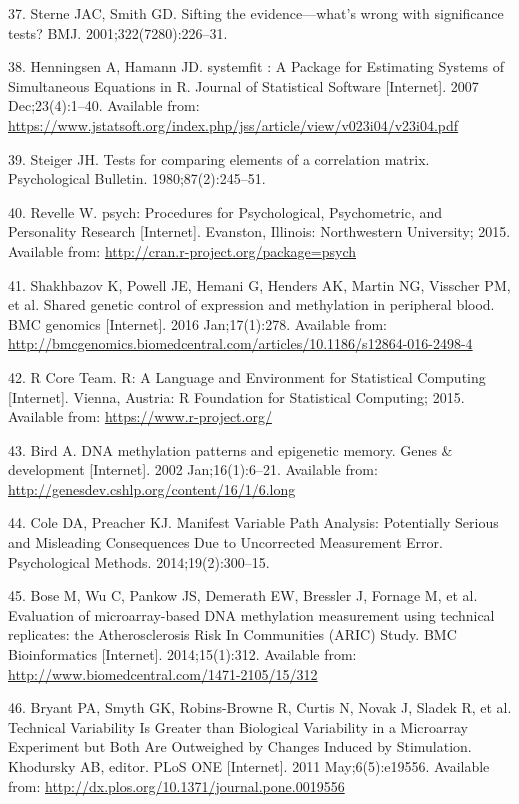 \documentclass[]{article}
\begin{document}
\hypertarget{ref-Sterne2001}{}
37. Sterne JAC, Smith GD. Sifting the evidence---what's wrong with
significance tests? BMJ. 2001;322(7280):226--31.

\hypertarget{ref-Henningsen2007}{}
38. Henningsen A, Hamann JD. systemfit : A Package for Estimating
Systems of Simultaneous Equations in R. Journal of Statistical Software
{[}Internet{]}. 2007 Dec;23(4):1--40. Available from:
\url{https://www.jstatsoft.org/index.php/jss/article/view/v023i04/v23i04.pdf}

\hypertarget{ref-Steiger1980}{}
39. Steiger JH. Tests for comparing elements of a correlation matrix.
Psychological Bulletin. 1980;87(2):245--51.

\hypertarget{ref-Revelle2015}{}
40. Revelle W. psych: Procedures for Psychological, Psychometric, and
Personality Research {[}Internet{]}. Evanston, Illinois: Northwestern
University; 2015. Available from:
\url{http://cran.r-project.org/package=psych}

\hypertarget{ref-Shakhbazov2016}{}
41. Shakhbazov K, Powell JE, Hemani G, Henders AK, Martin NG, Visscher
PM, et al. Shared genetic control of expression and methylation in
peripheral blood. BMC genomics {[}Internet{]}. 2016 Jan;17(1):278.
Available from:
\url{http://bmcgenomics.biomedcentral.com/articles/10.1186/s12864-016-2498-4}

\hypertarget{ref-RCoreTeam2015}{}
42. R Core Team. R: A Language and Environment for Statistical Computing
{[}Internet{]}. Vienna, Austria: R Foundation for Statistical Computing;
2015. Available from: \url{https://www.r-project.org/}

\hypertarget{ref-Bird2002}{}
43. Bird A. DNA methylation patterns and epigenetic memory. Genes \&
development {[}Internet{]}. 2002 Jan;16(1):6--21. Available from:
\url{http://genesdev.cshlp.org/content/16/1/6.long}

\hypertarget{ref-Cole2014}{}
44. Cole DA, Preacher KJ. Manifest Variable Path Analysis: Potentially
Serious and Misleading Consequences Due to Uncorrected Measurement
Error. Psychological Methods. 2014;19(2):300--15.

\hypertarget{ref-Bose2014}{}
45. Bose M, Wu C, Pankow JS, Demerath EW, Bressler J, Fornage M, et al.
Evaluation of microarray-based DNA methylation measurement using
technical replicates: the Atherosclerosis Risk In Communities (ARIC)
Study. BMC Bioinformatics {[}Internet{]}. 2014;15(1):312. Available
from: \url{http://www.biomedcentral.com/1471-2105/15/312}

\hypertarget{ref-Bryant2011}{}
46. Bryant PA, Smyth GK, Robins-Browne R, Curtis N, Novak J, Sladek R,
et al. Technical Variability Is Greater than Biological Variability in a
Microarray Experiment but Both Are Outweighed by Changes Induced by
Stimulation. Khodursky AB, editor. PLoS ONE {[}Internet{]}. 2011
May;6(5):e19556. Available from:
\url{http://dx.plos.org/10.1371/journal.pone.0019556}
\end{document}
